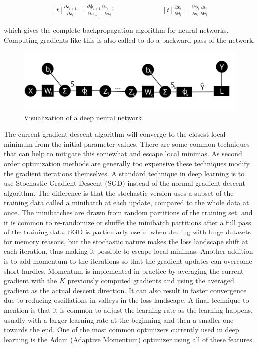 \begin{equation}
\begin{aligned}[t]
    \frac{\partial \bm{z}_{i+1}}{\partial \bm{z}_i}
    = \frac{\partial \bm{\phi}_{i+1}}{\partial \bm{s}_{i+1}} \frac{\partial \bm{s}_{i+1}}{\partial \bm{z}_i}
\end{aligned}
\qquad
\qquad
\qquad
\begin{aligned}[t]
    \frac{\partial \bm{z}_i}{\partial \bm{\theta}_i}
    = \frac{\partial \bm{\phi}_i}{\partial \bm{s}_i} \frac{\partial \bm{s}_i}{\partial \bm{\theta}_i}
\end{aligned}
\end{equation}

\noindent which gives the complete backpropagation algorithm for neural networks. Computing gradients like this is also called to do a backward pass of the network.

\begin{figure}[H]
    \centering
    \includegraphics[width=0.8\linewidth]{Figures/Misc/deepnetwork.png}
    \caption{Visualization of a deep neural network.}
    \label{fig:deepnetwork}
\end{figure}

The current gradient descent algorithm will converge to the closest local minimum from the initial parameter values. There are some common techniques that can help to mitigate this somewhat and escape local minimas. As second order optimization methods are generally too expensive these techniques modify the gradient iterations themselves. A standard technique in deep learning is to use Stochastic Gradient Descent (SGD) instead of the normal gradient descent algorithm. The difference is that the stochastic version uses a subset of the training data called a minibatch at each update, compared to the whole data at once. The minibatches are drawn from random partitions of the training set, and it is common to re-randomize or shuffle the minibatch partitions after a full pass of the training data. SGD is particularly useful when dealing with large datasets for memory reasons, but the stochastic nature makes the loss landscape shift at each iteration, thus making it possible to escape local minimas. Another addition is to add momentum to the iterations so that the gradient updates can overcome short hurdles. Momentum is implemented in practice by averaging the current gradient with the $K$ previously computed gradients and using the averaged gradient as the actual descent direction. It can also result in faster convergence due to reducing oscillations in valleys in the loss landscape. A final technique to mention is that it is common to adjust the learning rate as the learning happens, usually with a larger learning rate at the beginning and then a smaller one towards the end. One of the most common optimizers currently used in deep learning is the Adam (Adaptive Momentum) optimizer \cite{kingma2017adam} using all of these features.

